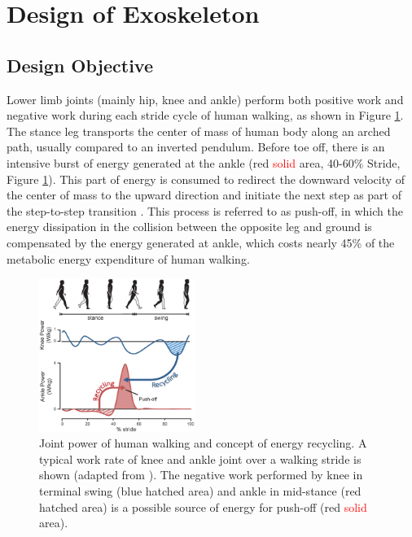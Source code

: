 \documentclass[twocolumn,cleanfoot,10pt]{asme2ej}
\begin{document}
\section{Design of Exoskeleton}
\label{sec:design}

\subsection{Design Objective}
\label{subsec:Biomechanics}

	Lower limb joints (mainly hip, knee and ankle) perform both positive work and negative work during each stride cycle of human walking, as shown in Figure \ref{fig:work}. The stance leg transports the center of mass of human body along an arched path, usually compared to an inverted pendulum\cite{RN13}. Before toe off, there is an intensive burst of energy generated at the ankle (red \textcolor{red}{solid} area, 40-60\% Stride, Figure \ref{fig:work}). This part of energy is consumed to redirect the downward velocity of the center of mass to the upward direction and initiate the next step as part of the step-to-step transition \cite{RN14}. This process is referred to as push-off, in which the energy dissipation in the collision between the opposite leg and ground is compensated by the energy generated at ankle, which costs nearly 45\% of the metabolic energy expenditure of human walking\cite{RN15}.

\begin{figure}[b]
	\centering
	\includegraphics[width=0.45\textwidth]{Figure1.eps}
	\caption{Joint power of human walking and concept of energy recycling. A typical work rate of knee and ankle joint over a walking stride is shown (adapted from \cite{RN2}). The negative work performed by knee in terminal swing (blue hatched area) and ankle in mid-stance (red hatched area) is a possible source of energy for push-off (red \textcolor{red}{solid} area).}
	\label{fig:work}   
\end{figure}
\end{document}
